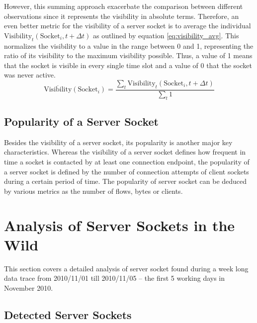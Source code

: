 However, this summing approach exacerbate the comparison between different observations since it represents the visibility in absolute terms. Therefore, an even better metric for the visibility of a server socket is to average the individual $\text{Visibility}_t(\text{Socket}_i,t+\Delta{t})$ as outlined by equation \ref{eq:visibility_avg}. This normalizes the visibility to a value in the range between 0 and 1, representing the ratio of its visibility to the maximum visibility possible. Thus, a value of 1 means that the socket is visible in every single time slot and a value of 0 that the socket was never active. 
\begin{equation}
	\overline{\text{Visibility}}(\text{Socket}_i) = \frac{\sum_{t} \text{Visibility}_t(\text{Socket}_i,t+\Delta{t})}{\sum_{t}1}
	\label{eq:visibility_avg} 
\end{equation}

\subsection{Popularity of a Server Socket}

Besides the visibility of a server socket, its popularity is another major key characteristics. Whereas the visibility of a server socket defines how frequent in time a socket is contacted by at least one connection endpoint, the popularity of a server socket is defined by the number of connection attempts of client sockets during a certain period of time. The popularity of server socket can be deduced by various metrics as the number of flows, bytes or clients.

\newpage
\section{Analysis of Server Sockets in the Wild}

This section covers a detailed analysis of server socket found during a week long data trace from 2010/11/01 till 2010/11/05 -- the first 5 working days in November 2010.

\subsection{Detected Server Sockets}



